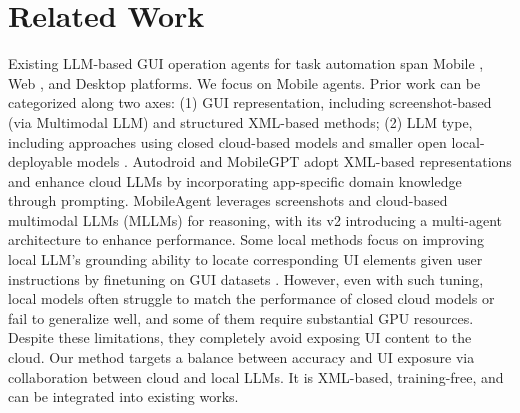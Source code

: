 \section{Related Work}
Existing LLM-based GUI operation agents \citep{liu2025llm, zhang2024large, wang2024gui, wu2024foundations, liu2024autoglm} for task automation span Mobile \citep{wang2023enabling, wen2024autodroid, wang2024mobile, wang2025mobile, DBLP:conf/chi/ZhangYLLHCHF025, lee2024mobilegpt, chen2024octopus, bai2024digirl, li2024appagent, wen2024autodroidv2, jiang2025appagentx, wang2025mobile-e}, Web \citep{deng2023mind2web, zheng2024gpt, gou2024navigating, gurreal, yangagentoccam}, and Desktop \citep{zhang2024ufo, niu2024screenagent, wu2024copilot, tan2024cradle} platforms. We focus on Mobile agents. Prior work can be categorized along two axes: (1) GUI representation, including screenshot-based (via Multimodal LLM) \citep{wang2024mobile, wang2025mobile, cheng2024seeclick, zhang2024you, ma2024coco, hong2024cogagent, you2024ferret, li2024ferret, song2024visiontasker,qin2025ui} and structured XML-based \citep{wang2023enabling, wen2024autodroid, wen2024autodroidv2, lee2024mobilegpt} methods; (2) LLM type, including approaches using closed cloud-based models \citep{wen2024autodroid, wang2024mobile, wang2025mobile,DBLP:conf/chi/ZhangYLLHCHF025, lee2024mobilegpt} and smaller open local-deployable models \cite{cheng2024seeclick, zhang2024you, ma2024coco, wen2024autodroidv2}. Autodroid \citep{wen2024autodroid} and MobileGPT \citep{lee2024mobilegpt} adopt XML-based representations and enhance cloud LLMs by incorporating app-specific domain knowledge through prompting. MobileAgent \citep{wang2024mobile} leverages screenshots and cloud-based multimodal LLMs (MLLMs) for reasoning, with its v2 \citep{wang2025mobile} introducing a multi-agent architecture to enhance performance. Some local methods \citep{ cheng2024seeclick, zhang2024you, ma2024coco, christianos2024lightweight} focus on improving local LLM's grounding ability to locate corresponding UI elements given user instructions by finetuning on GUI datasets \citep{sun2022meta, rawles2023androidinthewild, lu2024gui}. However, even with such tuning, local models often struggle to match the performance of closed cloud models or fail to generalize well, and some of them require substantial GPU resources. Despite these limitations, they completely avoid exposing UI content to the cloud. Our method targets a balance between accuracy and UI exposure via collaboration between cloud and local LLMs. It is XML-based, training-free, and can be integrated into existing works.